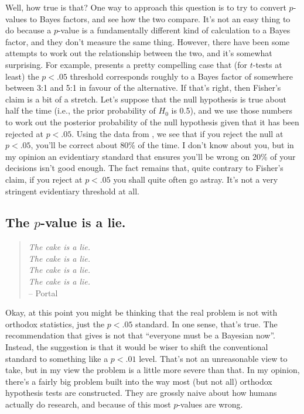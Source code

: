 Well, how true is that? One way to approach this question is to try to convert $p$-values to Bayes factors, and see how the two compare. It's not an easy thing to do because a $p$-value is a fundamentally different kind of calculation to a Bayes factor, and they don't measure the same thing. However, there have been some attempts to work out the relationship between the two, and it's somewhat surprising. For example,  presents a pretty compelling case that (for $t$-tests at least) the  $p<.05$ threshold corresponds roughly to a Bayes factor of somewhere between 3:1 and 5:1 in favour of the alternative. If that's right, then Fisher's claim is a bit of a stretch. Let's suppose that the null hypothesis is true about half the time (i.e., the prior probability of $H_0$ is 0.5), and we use those numbers to work out the posterior probability of the null hypothesis given that it has been rejected at $p<.05$. Using the data from , we see that if you reject the null at $p<.05$, you'll be correct about 80\% of the time. I don't know about you, but in my opinion an evidentiary standard that ensures you'll be wrong on 20\% of your decisions isn't good enough. The fact remains that, quite contrary to Fisher's claim, if you reject at $p<.05$ you shall quite often go astray. It's not a very stringent evidentiary threshold at all. 


\subsection{The $p$-value is a lie.}

\begin{quote}
{\it The cake is a lie.} \\ 
{\it The cake is a lie.} \\ 
{\it The cake is a lie.} \\ 
{\it The cake is a lie.} \\ 
\hspace*{1cm} -- Portal
\end{quote}

Okay, at this point you might be thinking that the real problem is not with orthodox statistics, just the $p<.05$ standard. In one sense, that's true. The recommendation that  gives is not that ``everyone must be a Bayesian now''. Instead, the suggestion is that it would be wiser to shift the conventional standard to something like a $p<.01$ level. That's not an unreasonable view to take, but in my view the problem is a little more severe than that. In my opinion, there's a fairly big problem built into the way most (but not all) orthodox hypothesis tests are constructed. They are grossly naive about how humans actually do research, and because of this most $p$-values are wrong. 

